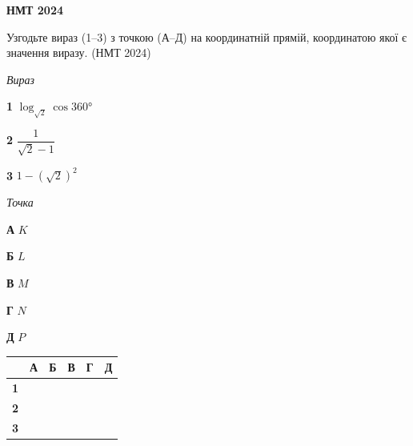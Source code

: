 \documentclass[14pt]{extarticle}
\newcommand{\matchTable}{
\begin{tabular}{|>{\centering\arraybackslash}p{0.3cm}|*{5}{>{\centering\arraybackslash}p{0.3cm}|}}
\hline
& \textbf{А} & \textbf{Б} & \textbf{В} & \textbf{Г} & \textbf{Д} \\
\hline
\textbf{1} & \rule{0pt}{0.3cm} & & & & \\
\hline
\textbf{2} & \rule{0pt}{0.3cm} & & & & \\
\hline
\textbf{3} & \rule{0pt}{0.3cm} & & & & \\
\hline
\end{tabular}
}
\newcommand{\task}[2]{\noindent\makebox[1.5em][l]{\textbf{#1.}}\parbox[t]{\dimexpr\textwidth-1.5em}{#2}}
\newcommand{\nmtyear}[1]{\hfill{\small\color{yearcolor}(НМТ #1)}}
\begin{document}

\newpage

\begin{center}
{\Large\textbf{\color{headerblue}НМТ 2024}}
\end{center}

\vspace{0.5cm}

\task{22}{Узгодьте вираз (1--3) з точкою (А--Д) на координатній прямій, координатою якої є значення виразу. \nmtyear{2024}}

\vspace{0.3cm}
\begin{center}
\end{center}

\vspace{0.3cm}
\begin{minipage}{0.35\textwidth}
\textit{Вираз}

\vspace{0.2cm}
\textbf{1} \quad $\log_{\sqrt{2}} \cos 360°$

\vspace{0.3cm}
\textbf{2} \quad $\dfrac{1}{\sqrt{2} - 1}$

\vspace{0.3cm}
\textbf{3} \quad $1 - (\sqrt{2})^2$
\end{minipage}
\hfill
\begin{minipage}{0.35\textwidth}
\textit{Точка}

\vspace{0.2cm}
\textbf{А} \quad $K$

\vspace{0.2cm}
\textbf{Б} \quad $L$

\vspace{0.2cm}
\textbf{В} \quad $M$

\vspace{0.2cm}
\textbf{Г} \quad $N$

\vspace{0.2cm}
\textbf{Д} \quad $P$
\end{minipage}
\hfill
\begin{minipage}{0.2\textwidth}
\matchTable
\end{minipage}
\end{document}
